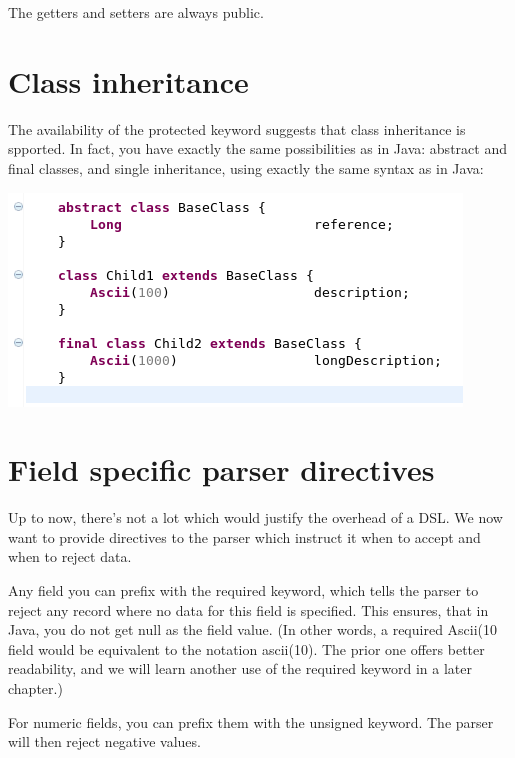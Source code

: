 \documentclass[11pt,a4paper,oneside]{article}
\begin{document}
\noindent The getters and setters are always public.

\section{Class inheritance}
The availability of the {\ttfamily protected} keyword suggests that class inheritance is spported. In fact, you have exactly the same
possibilities as in Java: abstract and final classes, and single inheritance, using exactly the same syntax as in Java:
 

\vspace{2mm}
\hspace{1cm}\includegraphics[scale=0.5]{images/tut1-007.png}


\section{Field specific parser directives}
Up to now, there's not a lot which would justify the overhead of a DSL.  
We now want to provide directives to the parser which instruct it when to accept and when to reject data. 

Any field you can prefix with the {\ttfamily required} keyword, which tells the parser to reject any record where no data for this field is specified.
This ensures, that in Java, you do not get {\ttfamily null} as the field value. (In other words, a {\ttfamily required Ascii(10} field would be equivalent
to the notation {\ttfamily ascii(10)}. The prior one offers better readability, and we will learn another use of the {\ttfamily required} keyword in a later
chapter.)

For numeric fields, you can prefix them with the {\ttfamily unsigned} keyword. The parser will then reject negative values.
\end{document}
